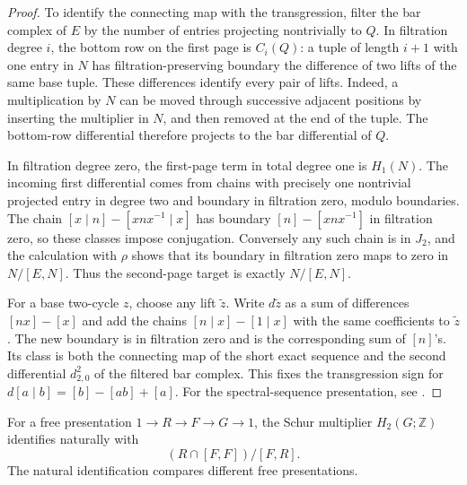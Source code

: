 \begin{proof}
To identify the connecting map with the transgression, filter the
bar complex of \(E\) by the number of entries projecting
nontrivially to \(Q\). In filtration degree \(i\), the bottom row
on the first page is \(C_i(Q)\): a tuple of length \(i+1\) with
one entry in \(N\) has filtration-preserving boundary the
difference of two lifts of the same base tuple. These differences
identify every pair of lifts. Indeed, a multiplication by \(N\)
can be moved through successive adjacent positions by inserting
the multiplier in \(N\), and then removed at the end of the
tuple. The bottom-row differential therefore projects to the bar
differential of \(Q\).

In filtration degree zero, the first-page term in total degree one
is \(H_1(N)\). The incoming first differential comes from
chains with precisely one nontrivial projected entry in degree
two and boundary in filtration zero, modulo boundaries.
The chain \([x\mid n]-[xnx^{-1}\mid x]\) has boundary
\([n]-[xnx^{-1}]\) in filtration zero, so these classes impose
conjugation. Conversely any such chain is in \(J_2\), and the
calculation with \(\rho\) shows that its boundary in filtration
zero maps to zero in \(N/[E,N]\). Thus the second-page target
is exactly \(N/[E,N]\).

For a base two-cycle \(z\), choose any lift \(\widetilde z\).
Write \(d\widetilde z\) as a sum of differences \([nx]-[x]\) and
add the chains \([n\mid x]-[1\mid x]\) with the same coefficients
to \(\widetilde z\). The new boundary is in filtration zero and
is the corresponding sum of \([n]\)'s. Its class is both the
connecting map of the short exact sequence and the second
differential \(d^2_{2,0}\) of the filtered bar complex. This fixes
the transgression sign for \(d[a\mid b]=[b]-[ab]+[a]\).
For the spectral-sequence presentation, see \cite[Section 6.8.3]{weibel}.
\end{proof}

\begin{theorem}
\label{thm:gr02-hopf-formula}
For a free presentation \(1\to R\to F\to G\to 1\), the Schur
multiplier \(H_2(G;\mathbb Z)\) identifies naturally with
\[
       (R\cap[F,F])/[F,R].
\]
The natural identification compares different free presentations.
\end{theorem}

